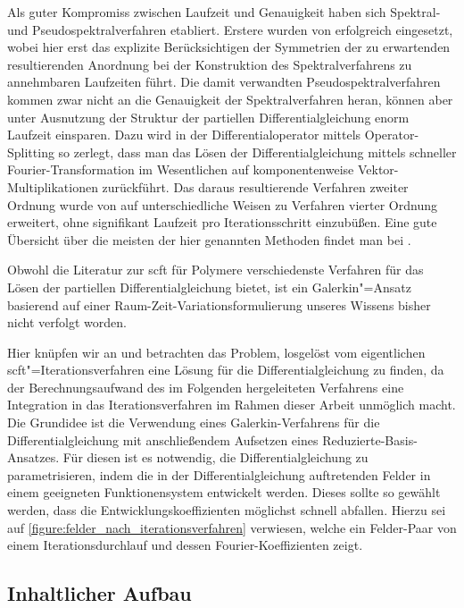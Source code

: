 \documentclass[../main.tex]{subfiles}
\begin{document}
Als guter Kompromiss zwischen Laufzeit und Genauigkeit haben sich Spektral- und Pseudospektralverfahren etabliert.
Erstere wurden von \textcite{Matsen:1994bz} erfolgreich eingesetzt, wobei hier erst das explizite Berücksichtigen der Symmetrien der zu erwartenden resultierenden Anordnung bei der Konstruktion des Spektralverfahrens zu annehmbaren Laufzeiten führt.
Die damit verwandten Pseudospektralverfahren kommen zwar nicht an die Genauigkeit der Spektralverfahren heran, können aber unter Ausnutzung der Struktur der partiellen Differentialgleichung enorm Laufzeit einsparen.
Dazu wird in \cite{Rasmussen:2002kt} der Differentialoperator mittels Operator-Splitting so zerlegt, dass man das Lösen der Differentialgleichung mittels schneller Fourier-Transformation im Wesentlichen auf komponentenweise Vektor-Multiplikationen zurückführt.
Das daraus resultierende Verfahren zweiter Ordnung wurde von \cite{GarciaCervera:2006uu,Ranjan:2007kl} auf unterschiedliche Weisen zu Verfahren vierter Ordnung erweitert, ohne signifikant Laufzeit pro Iterationsschritt einzubüßen.
Eine gute Übersicht über die meisten der hier genannten Methoden findet man bei \textcites[Section 3.6]{Fredrickson:2006th}{Audus:2013ep}.

Obwohl die Literatur zur \ac{scft} für Polymere verschiedenste Verfahren für das Lösen der partiellen Differentialgleichung bietet, ist ein Galerkin"=Ansatz basierend auf einer Raum-Zeit-Variationsformulierung unseres Wissens bisher nicht verfolgt worden.

Hier knüpfen wir an und betrachten das Problem, losgelöst vom eigentlichen \ac{scft}"=Iterationsverfahren eine Lösung für die Differentialgleichung zu finden, da der Berechnungsaufwand des im Folgenden hergeleiteten Verfahrens eine Integration in das Iterationsverfahren im Rahmen dieser Arbeit unmöglich macht.
Die Grundidee ist die Verwendung eines Galerkin-Verfahrens für die Differentialgleichung mit anschließendem Aufsetzen eines Reduzierte-Basis-Ansatzes.
Für diesen ist es notwendig, die Differentialgleichung zu parametrisieren, indem die in der Differentialgleichung auftretenden Felder in einem geeigneten Funktionensystem entwickelt werden.
Dieses sollte so gewählt werden, dass die Entwicklungskoeffizienten möglichst schnell abfallen.
Hierzu sei auf \cref{figure:felder_nach_iterationsverfahren} verwiesen, welche ein Felder-Paar von einem Iterationsdurchlauf und dessen Fourier-Koeffizienten zeigt.


\subsection*{Inhaltlicher Aufbau}
\end{document}
